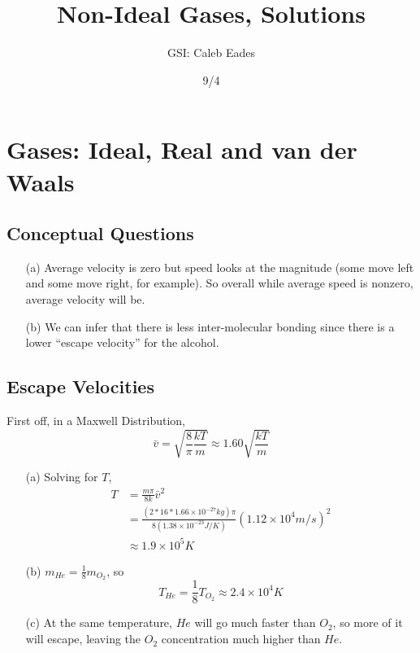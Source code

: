 \documentclass{article}
\begin{document}
	
\title{Non-Ideal Gases, Solutions}
\author{GSI: Caleb Eades}
\date{9/4}
\maketitle

\section{Gases: Ideal, Real and van der Waals}

\subsection{Conceptual Questions}

\begin{itemize}
	\item[(a)] Average velocity is zero but speed looks at the magnitude (some move left and some move right, for example). So overall while average speed is nonzero, average velocity will be.
	\item[(b)] We can infer that there is less inter-molecular bonding since there is a lower ``escape velocity'' for the alcohol.
\end{itemize}

\subsection{Escape Velocities}

First off, in a Maxwell Distribution,
\begin{equation}
\bar{v}=\sqrt{\frac{8}{\pi}\frac{kT}{m}} \approx 1.60\sqrt{\frac{kT}{m}}
\end{equation}
\begin{itemize}
	\item[(a)] Solving for $T$,
	\begin{align*}
	T &= \frac{m\pi}{8k}\bar{v}^2 \\
	&= \frac{(2*16*1.66\times10^{-27} kg)\pi}{8(1.38\times10^{-23} J/K)}(1.12\times 10^4 m/s)^2 \\
	&\approx 1.9\times10^5 K
	\end{align*}
	\item[(b)] $m_{He} = \frac{1}{8}m_{O_2}$, so
	\begin{equation}
	T_{He} = \frac{1}{8}T_{O_2}\approx2.4\times10^4 K
	\end{equation}
	\item[(c)] At the same temperature, $He$ will go much faster than $O_2$, so more of it will escape, leaving the $O_2$ concentration much higher than $He$.
\end{itemize}
\end{document}
